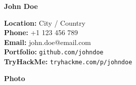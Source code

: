 \documentclass[a4paper,10pt]{article}
\begin{document}
\noindent
\hspace{3mm}
\begin{minipage}{0.40\textwidth}
    {\Huge\bf John Doe}
\end{minipage}
\begin{minipage}{0.35\textwidth}
    \begin{flushleft}
    \small
        \textbf{Location:} City / Country \\
        \textbf{Phone:} +1 123 456 789 \\
        \textbf{Email:} john.doe@email.com \\
        \textbf{Portfolio:} \texttt{github.com/johndoe} \\
        \textbf{TryHackMe:} \texttt{tryhackme.com/p/johndoe}
    \end{flushleft}
\end{minipage}
\hspace{1mm}
\begin{minipage}{0.1\textwidth}
    \begin{tcolorbox}[width=3.5cm,height=3.5cm, sharp corners]
        \centering
        \textbf{Photo}
    \end{tcolorbox}
\end{minipage}
\vspace{5mm}
\end{document}
